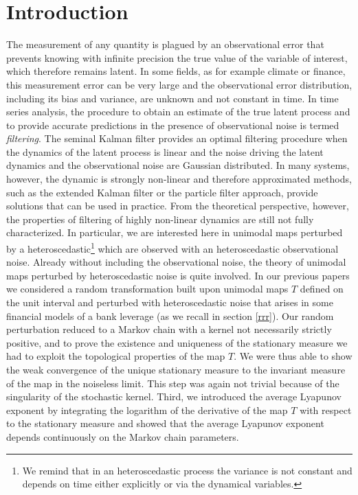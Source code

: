 \documentclass{article}
\newcommand{\1}{\mathbbm{1}}
\begin{document}
\section{Introduction}
The measurement of any quantity is plagued by an observational error that prevents knowing with infinite precision the true value of the variable of interest, which therefore remains latent. In some fields, as for example climate or finance, this measurement error can be very large and the observational error distribution, including its bias and variance, are unknown and not constant in time. In time series analysis, the procedure to obtain an estimate of the true latent process and to provide accurate predictions in the presence of observational noise is termed {\it filtering}. The seminal Kalman filter provides an optimal filtering procedure when the dynamics of the latent process is linear and the noise driving the latent dynamics and the observational noise are Gaussian distributed. 
In many systems, however, the dynamic is strongly non-linear and therefore approximated methods, such as the extended Kalman filter or the particle filter approach, provide solutions that can be used in practice.
From the theoretical perspective, however, the properties of filtering of highly non-linear dynamics are still not fully characterized. In particular, we are interested here in unimodal maps perturbed by a heteroscedastic\footnote{We remind that in an heteroscedastic process the variance is not constant and depends on time either explicitly or via the dynamical variables.} which are observed with an heteroscedastic observational noise. Already without including the observational noise, the theory of unimodal maps perturbed by heteroscedastic noise is quite involved.
In our previous papers \cite{lillo21,lillo22} we
considered a random transformation built upon unimodal maps $T$ defined on the unit interval and perturbed with heteroscedastic noise that arises in some financial models of a bank leverage (as we recall in section \ref{rrr}). Our random perturbation reduced to a Markov chain with a kernel not necessarily strictly positive, and to prove the existence and uniqueness of the stationary measure we had to exploit the topological properties of the map $T$. We were thus able to  show the weak convergence of the unique stationary measure to the invariant measure of the map in the noiseless limit. This step was again 
not trivial because of the singularity of  the stochastic kernel. Third, we
introduced the average Lyapunov exponent by integrating the logarithm of the derivative of the
map $T$ with respect to the stationary measure and showed that the average Lyapunov exponent
depends continuously on the Markov chain parameters. 
\end{document}
